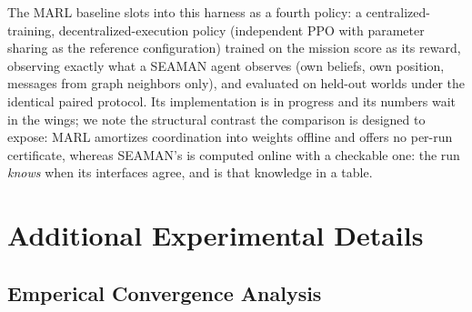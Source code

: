 \documentclass[10pt]{article}
\newif\ifshowcomments
\theoremstyle{definition}
\theoremstyle{remark}
\newcommand{\task}[1]{%
    \ifshowcomments
        ~\todo[inline, color=buzzgold!60, textcolor=black,caption={Task}]{{\bf Task:} #1}%
    \fi
}
\begin{document}
The MARL baseline slots into this harness as a fourth policy: a centralized-training, decentralized-execution policy (independent PPO with parameter sharing as the reference configuration) trained on the mission score as its reward, observing exactly what a SEAMAN agent observes (own beliefs, own position, messages from graph neighbors only), and evaluated on held-out worlds under the identical paired protocol. Its implementation is in progress and its numbers wait in the wings; we note the structural contrast the comparison is designed to expose: MARL amortizes coordination into weights offline and offers no per-run certificate, whereas SEAMAN's is computed online with a checkable one: the run \emph{knows} when its interfaces agree, and  is that knowledge in a table.

\task{MARL numbers (TBD): algorithm and training budget as run, seeds, and the paired table extending \Cref{tab:benchmark} --- time to completion, score, unsafe entries, arrival rate --- under identical worlds and communication constraints.}

\nocite{*}

\setlength{\bibsep}{2.5pt}
{\footnotesize

}

\appendix
\section{Additional Experimental Details}
\label{sec:appendix}

\subsection{Emperical Convergence Analysis}
\label{sec:app-convergence}
\end{document}

